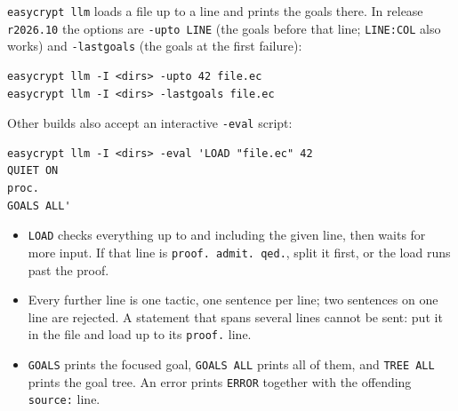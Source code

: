 \documentclass[10pt,a4paper]{article}
\newcommand{\ec}{\lstinline[basicstyle=\small\ttfamily]}
\begin{document}
\ec|easycrypt llm| loads a file up to a line and prints the goals there.
In release \texttt{r2026.10} the options are \texttt{-upto LINE} (the goals before that line; \texttt{LINE:COL} also works) and \texttt{-lastgoals} (the goals at the first failure):

\begin{lstlisting}[language={},numbers=none]
easycrypt llm -I <dirs> -upto 42 file.ec
easycrypt llm -I <dirs> -lastgoals file.ec
\end{lstlisting}

\noindent
Other builds also accept an interactive \texttt{-eval} script:

\begin{lstlisting}[language={},numbers=none]
easycrypt llm -I <dirs> -eval 'LOAD "file.ec" 42
QUIET ON
proc.
GOALS ALL'
\end{lstlisting}

\begin{itemize}
  \item \texttt{LOAD} checks everything up to and including the given line, then waits for more input.
    If that line is \ec|proof. admit. qed.|, split it first, or the load runs past the proof.
  \item Every further line is one tactic, one sentence per line; two sentences on one line are rejected.
    A statement that spans several lines cannot be sent: put it in the file and load up to its \ec|proof.| line.
  \item \texttt{GOALS} prints the focused goal, \texttt{GOALS ALL} prints all of them, and \texttt{TREE ALL} prints the goal tree.
    An error prints \texttt{ERROR} together with the offending \texttt{source:} line.
\end{itemize}
\end{document}
